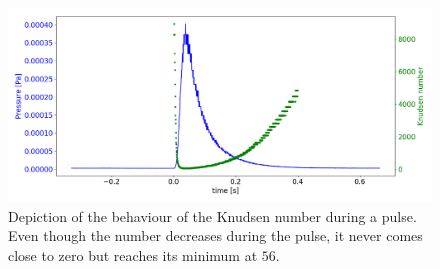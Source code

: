 \documentclass[a4paper,10pt]{article}
\begin{document}
\begin{figure}[H]
	\centering
	\includegraphics[width = \textwidth]{knudsen}
	\caption{Depiction of the behaviour of the Knudsen number during a pulse. Even though the number decreases during the pulse, it never comes close to zero but reaches its minimum at $56$. }
	\label{fig_knudsennumber}
\end{figure}
\end{document}

